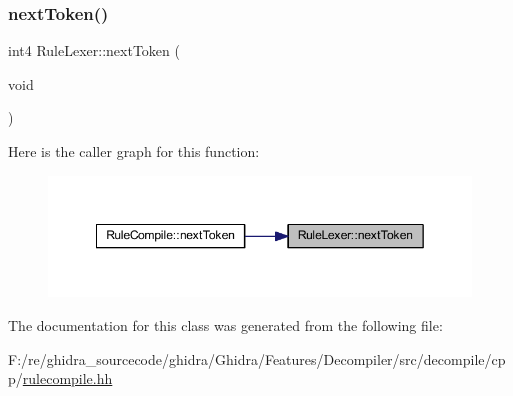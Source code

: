 \mbox{\label{class_rule_lexer_ad396de215b67472a4c77fe5c591599f0}} 
\subsubsection{\texorpdfstring{nextToken()}{nextToken()}}
{\footnotesize\ttfamily int4 Rule\+Lexer\+::next\+Token (\begin{DoxyParamCaption}\item[{void}]{ }\end{DoxyParamCaption})}

Here is the caller graph for this function\+:
\nopagebreak
\begin{figure}[H]
\begin{center}
\leavevmode
\includegraphics[width=349pt]{class_rule_lexer_ad396de215b67472a4c77fe5c591599f0_icgraph}
\end{center}
\end{figure}


The documentation for this class was generated from the following file\+:\begin{DoxyCompactItemize}
\item 
F\+:/re/ghidra\+\_\+sourcecode/ghidra/\+Ghidra/\+Features/\+Decompiler/src/decompile/cpp/\mbox{\hyperlink{rulecompile_8hh}{rulecompile.\+hh}}\end{DoxyCompactItemize}
